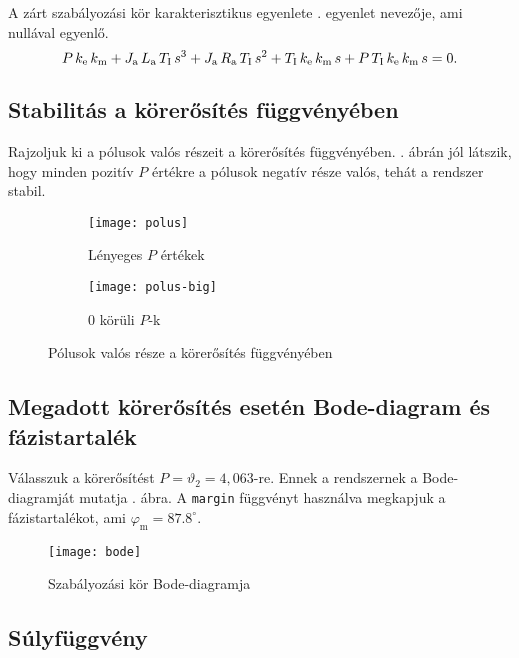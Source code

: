 A zárt szabályozási kör karakterisztikus egyenlete . egyenlet nevezője, 
ami nullával egyenlő.
\begin{equation}
	P\, k_\text{e}\, k_\text{m} + J_\text{a}\, L_\text{a}\, T_\text{I}\, s^3 + J_\text{a}\, R_\text{a}\, T_\text{I}\, s^2 + T_\text{I}\, k_\text{e}\, k_\text{m}\, s + P\, T_\text{I}\, k_\text{e}\, k_\text{m}\, s = 0.
\end{equation}

\subsection{Stabilitás a körerősítés függvényében}

Rajzoljuk ki a pólusok valós részeit a körerősítés függvényében.
. ábrán jól látszik, hogy minden pozitív $P$ értékre a pólusok
negatív része valós, tehát a rendszer stabil.
\begin{figure}[H]
	\centering
	\begin{subfigure}{.49\textwidth}
		\texttt{[image: polus]}
		\caption{Lényeges $P$ értékek}
	\end{subfigure}
	\begin{subfigure}{.49\textwidth}
		\texttt{[image: polus-big]}
		\caption{0 körüli $P$-k}
	\end{subfigure}
	\caption{Pólusok valós része a körerősítés függvényében}
	\label{fig:poles}
\end{figure}


\subsection{Megadott körerősítés esetén Bode-diagram és fázistartalék}

Válasszuk a körerősítést $P=\vartheta_2 = 4,063$-re.
Ennek a rendszernek a Bode-diagramját mutatja . ábra.
A \verb|margin| függvényt használva megkapjuk a fázistartalékot,
ami $\varphi_\text{m}=87.8^\circ$.

\begin{figure}[H]
	\centering
	\texttt{[image: bode]}
	\caption{Szabályozási kör Bode-diagramja}
	\label{fig:bode}
\end{figure}


\subsection{Súlyfüggvény}

